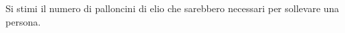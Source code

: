 













\begin{exercise}

Si stimi il numero di palloncini di elio che sarebbero necessari per sollevare una
persona.

\end{exercise}


